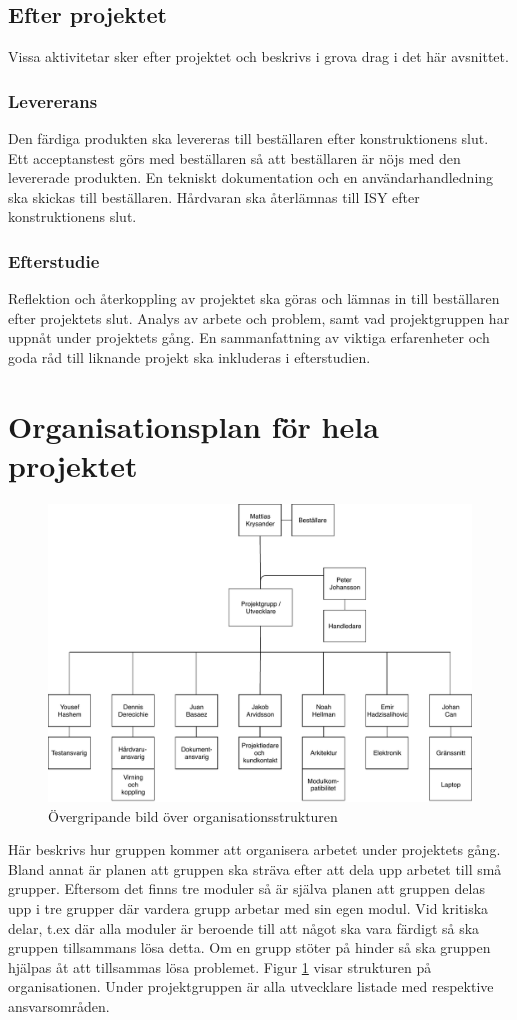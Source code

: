 \documentclass[projektplan/plan.tex]{subfiles}
\begin{document}
\subsection{Efter projektet}
Vissa aktivitetar sker efter projektet och beskrivs i grova drag i det här
avsnittet.
\subsubsection*{Levererans}
Den färdiga produkten ska levereras till beställaren efter konstruktionens
slut. Ett acceptanstest görs med beställaren så att beställaren är nöjs med den
levererade produkten. En tekniskt dokumentation och en användarhandledning ska
skickas till beställaren. Hårdvaran ska återlämnas till ISY efter
konstruktionens slut.
\subsubsection*{Efterstudie}
Reflektion och återkoppling av projektet ska göras och lämnas in till
beställaren efter projektets slut. Analys av arbete och problem, samt vad
projektgruppen har uppnåt under projektets gång. En sammanfattning av viktiga
erfarenheter och goda råd till liknande projekt ska inkluderas i efterstudien.

\newpage
\section{Organisationsplan för hela projektet}

\begin{figure}[h]
    \centering
    \includegraphics[width=0.6\linewidth]{projektplan/figures/orgplan.pdf}
    \caption{Övergripande bild över organisationsstrukturen}
    \label{fig:orgplan}
\end{figure}

Här beskrivs hur gruppen kommer att organisera arbetet under projektets gång.
Bland annat är planen att gruppen ska sträva efter att dela upp arbetet till
små grupper. Eftersom det finns tre moduler så är själva planen att gruppen
delas upp i tre grupper där vardera grupp arbetar med sin egen modul. Vid
kritiska delar, t.ex där alla moduler är beroende till att något ska vara
färdigt så ska gruppen tillsammans lösa detta. Om en grupp stöter på hinder
så ska gruppen hjälpas åt att tillsammas lösa problemet. Figur \ref{fig:orgplan} visar strukturen på organisationen. Under projektgruppen är alla utvecklare listade med respektive ansvarsområden.  
\newpage
\end{document}
